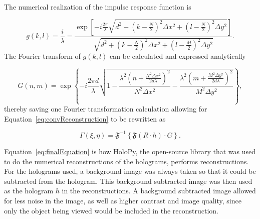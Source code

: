 
    The numerical realization of the impulse response function is

    \begin{equation}
        g(k,l)=\frac{i}{\lambda}=\frac{\exp\left[
        -i\frac{2\pi}{\lambda}\sqrt{d^2+\left(k-\frac{N}{2}\right)^2\Delta x^2+\left(
        l-\frac{N}{2}
    \right)^{2}\Delta y^2} \right]}{\sqrt{d^2+\left(k-\frac{N}{2}\right)^2\Delta x^2+\left(
        l-\frac{M}{2}
    \right)^{2}\Delta y^2}} .
    \end{equation}
    The Fourier transform of $g(k,l)$ can be calculated and expressed
    analytically

    \begin{equation}
        G(n,m) = \exp\left\{ -i\frac{2\pi
        d}{\lambda}\sqrt{1-\frac{\lambda^{2}\left( n+\frac{N^2\Delta
        x^2}{2d\lambda} \right)^2}{N^2\Delta x^2}-\frac{\lambda^{2}\left( m+\frac{M^2\Delta
        y^2}{2d\lambda} \right)^2}{M^2\Delta y^2}} \right\} ,
    \end{equation}
    thereby saving one Fourier transformation calculation allowing for
    Equation~\ref{eq:convReconstruction} to be rewritten as

    \begin{equation}
        \Gamma(\xi,\eta) = \mathfrak{F}^{-1}\left\{ \mathfrak{F}(R\cdot h)
        \cdot G \right\} .
        \label{eq:finalEquation}
    \end{equation}

    Equation~\ref{eq:finalEquation} is how HoloPy, the open-source library that
    was used to do the numerical reconstructions of the holograms, performs
    reconstructions. For the holograms used, a background image was always
    taken so that it could be subtracted from the hologram. This background
    subtracted image was then used as the hologram $h$ in the reconstructions.
    A background subtracted image allowed for less noise in the image, as well
    as higher contrast and image quality, since only the object being viewed
    would be included in the reconstruction.








%
%
%
% 
